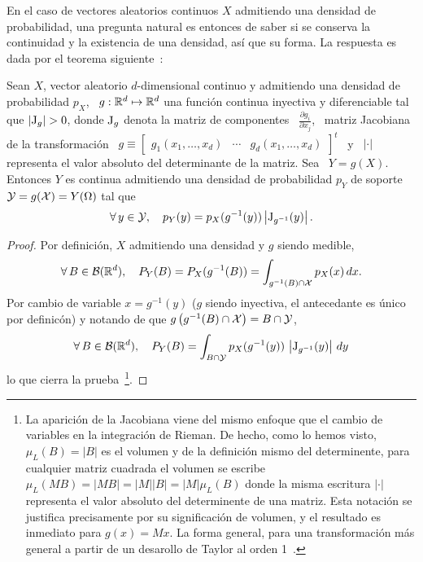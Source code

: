 En  el caso  de vectores  aleatorios continuos  $X$ admitiendo  una  densidad de
probabilidad,  una pregunta  natural  es entonces  de  saber si  se conserva  la
continuidad y la existencia de una densidad, as\'i que su forma. La respuesta es
dada por el teorema siguiente~\cite{Bre88, JacPro03, AthLah06, Coh13, HogMck13}:
%
\begin{teorema}
  Sean $X$, vector aleatorio  $d$-dimensional continuo y admitiendo una densidad
  de probabilidad  $p_X$, \ $g:\mathbb{R}^d  \mapsto \mathbb{R}^d$ una  funci\'on continua
  inyectiva y diferenciable tal que
 $\left| \operatorname{J}_g \right| > 0$,
 donde $\operatorname{J}_g$ denota la  matriz de componentes \ $\frac{\partial g_i}{\partial
   x_j}$, \ matriz Jacobiana de  la transformaci\'on \ $g \equiv \begin{bmatrix}
   g_1(x_1 , \ldots , x_d) & \cdots & g_d(x_1 , \ldots , x_d) \end{bmatrix}^t$ \
 y \ $|\cdot|$ representa el valor absoluto del determinante de la matriz. Sea \
 $Y = g(X)$.   Entonces $Y$ es continua admitiendo  una densidad de probabilidad
 $p_Y$ de soporte $\mathcal{Y} = g(\mathcal{X}) = Y(\Omega)$ tal que
  \[
  \forall \,  y \in  \mathcal{Y}, \quad p_Y(y)  = p_X(g^{-1}(y))  \left| \operatorname{J}_{g^{-1}}(y)
  \right|.
  \]
\end{teorema}
%
\begin{proof}
Por definici\'on, $X$ admitiendo una densidad y $g$ siendo medible,
%
\[
\forall \, B  \in \mathcal{B}(\mathbb{R}^d), \quad P_Y(B) =  P_X(g^{-1}(B)) = \int_{g^{-1}(B) \cap \mathcal{X}}
p_X(x) \, dx.
\]
%
Por cambio de variable $x =  g^{-1}(y)$ ($g$ siendo inyectiva, el antecedante es
\'unico por definic\'on) y notando de que $g\left( g^{-1}(B) \cap \mathcal{X} \right) = B
\cap \mathcal{Y}$,
%
\[
\forall \, B \in \mathcal{B}(\mathbb{R}^d), \quad  P_Y(B) = \int_{B \cap \mathcal{Y}} p_X(g^{-1}(y)) \,
\left| \operatorname{J}_{g^{-1}}(y) \right| \, dy
\]
%
lo que cierra la prueba~\footnote{La aparici\'on de la Jacobiana viene del mismo
  enfoque que  el cambio de variables  en la integraci\'on de  Rieman. De hecho,
  como lo hemos visto, $\mu_L(B) = |B|$ es el volumen y de la definici\'on mismo
  del  determinente, para  cualquier matriz  cuadrada  el volumen  se escribe  \
  $\mu_L(M  B) =  |M B|  = |M|  |B|  = |M|  \mu_L(B)$ donde  la misma  escritura
  $|\cdot|$ representa  el valor absoluto  del determinente de una  matriz. Esta
  notaci\'on se justifica  precisamente por su significaci\'on de  volumen, y el
  resultado  es  inmediato  para $g(x)  =  M  x$.  La  forma general,  para  una
  transformaci\'on m\'as  general a  partir de un  desarollo de Taylor  al orden
  1~\cite{AthLah06, Coh13}.}.
\end{proof}

